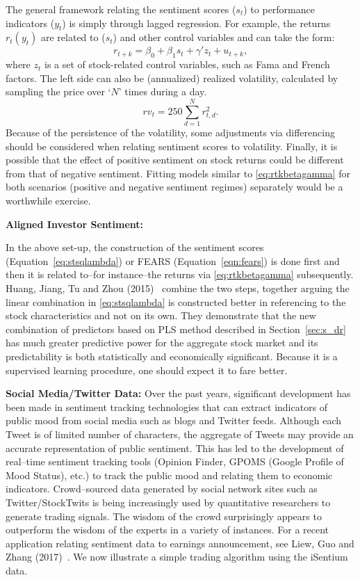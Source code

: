 The general framework relating the sentiment scores ($s_t$) to performance indicators ($y_t$) is simply through lagged regression. For example, the returns $r_t(y_t)$ are related to ($s_t$) and other control variables and can take the form:
	\begin{equation} \label{eq:rtkbetagamma}
	r_{t+k}= \beta_0 + \beta_1 s_t + \gamma' z_t + u_{t+k},
	\end{equation}
where $z_t$ is a set of stock-related control variables, such as Fama and French factors. The left side can also be (annualized) realized volatility, calculated by sampling the price over `$N$' times during a day. 
	\begin{equation}
	rv_t = 250 \sum_{d=1}^N r_{t,d}^2.
	\end{equation}
Because of the persistence of the volatility, some adjustments via differencing should be considered when relating sentiment scores to volatility. Finally, it is possible that the effect of positive sentiment on stock returns could be different from that of negative sentiment. Fitting models similar to \eqref{eq:rtkbetagamma} for both scenarios (positive and negative sentiment regimes) separately would be a worthwhile exercise. \twomedskip


\noindent\textbf{Aligned Investor Sentiment:} \twomedskip


In the above set-up, the construction of the sentiment scores (Equation~\ref{eq:stsqlambda}) or FEARS (Equation~\ref{eqn:fears}) is done first and then it is related to--for instance--the returns via \eqref{eq:rtkbetagamma} subsequently. Huang, Jiang, Tu and Zhou (2015)~\cite{huang} combine the two steps, together arguing the linear combination in \eqref{eq:stsqlambda} is constructed better in referencing to the stock characteristics and not on its own. They demonstrate that the new combination of predictors based on PLS method described in Section~\ref{sec:s_dr} has much greater predictive power for the aggregate stock market and its predictability is both statistically and economically significant. Because it is a supervised learning procedure, one should expect it to fare better. \twomedskip


\noindent \textbf{Social Media/Twitter Data:}\label{in:social} Over the past years, significant development has been made in sentiment tracking technologies that can extract indicators of public mood from social media such as blogs and Twitter feeds. Although each Tweet is of limited number of characters, the aggregate of Tweets may provide an accurate representation of public sentiment. This has led to the development of real--time sentiment tracking tools (Opinion Finder, GPOMS (Google Profile of Mood Status), etc.) to track the public mood and relating them to economic indicators. Crowd--sourced data generated by social network sites such as Twitter/StockTwits is being increasingly used by quantitative researchers to generate trading signals. The wisdom of the crowd surprisingly appears to outperform the wisdom of the experts in a variety of instances. For a recent application relating sentiment data to earnings announcement, see Liew, Guo and Zhang (2017)~\cite{liewzhang}. We now illustrate a simple trading algorithm using the iSentium data.


